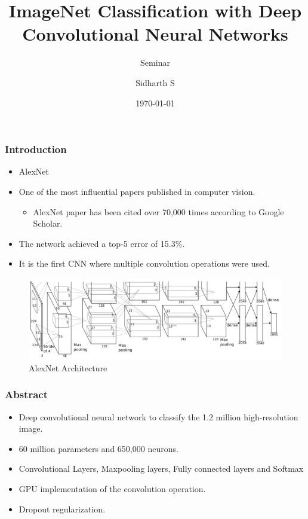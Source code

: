 \documentclass[aspectratio=169, 11pt]{beamer}
\title{ImageNet Classification with Deep Convolutional
Neural Networks}
\author{Sidharth S}
\subtitle{Seminar}
\date{\today}
\institute{Rajagiri School of Engineering and Technology}
\begin{document}
\maketitle %


\begin{frame}
\frametitle{Introduction}
\begin{itemize}
\item AlexNet
\item One of the most influential papers published in computer vision.
	\begin{itemize}
	\item  AlexNet paper has been cited over 70,000 times according to Google Scholar.
	\end{itemize}
\item The network achieved a top-5 error of 15.3\%.
\item It is the first CNN where multiple convolution operations were used.
\end{itemize}

\begin{figure}
\includegraphics[scale=0.4]{alexnet}
\caption{AlexNet Architecture}
\end{figure}

\end{frame}

\begin{frame}
	\frametitle{Abstract}
	\begin{itemize}
		\item Deep convolutional neural network to classify the 1.2 million
high-resolution image.
		\item 60 million parameters and 650,000 neurons.
		\item Convolutional Layers, Maxpooling layers, Fully connected layers and Softmax
		\item GPU implementation of the convolution operation.
		\item Dropout regularization.
	\end{itemize}

\end{frame}
\end{document}
